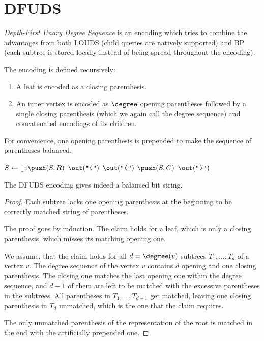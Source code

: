 \section{DFUDS}

\emph{Depth-First Unary Degree Sequence} is an encoding which tries to combine the advantages from both LOUDS (child queries are natively supported) and BP (each subtree is stored locally instead of being spread throughout the encoding).

The encoding is defined recursively:
\begin{enumerate}
	\item A leaf is encoded as a closing parenthesis.
	\item An inner vertex is encoded as $\degree$ opening parentheses followed by a single closing parenthesis (which we again call the degree sequence) and concatenated encodings of its children.
\end{enumerate}
For convenience, one opening parenthesis is prepended to make the sequence of parentheses balanced.

\begin{algorithm}
\begin{algorithmic}
	\State $S \gets []; \push(S, R)$ 
	\State $\out(\openingParen)$
			\State $\out(\openingParen)$
			\State $\push(S, C)$
		\EndFor
		\State $\out(\closingParen)$
	\EndWhile
\EndFunction
\end{algorithmic}
\end{algorithm}

\begin{lemma}\label{l:dfuds}
	The DFUDS encoding gives indeed a balanced bit string.
\end{lemma}
\begin{proof}
	Each subtree lacks one opening parenthesis at the beginning to be correctly matched string of parentheses.
	
	The proof goes by induction.
	The claim holds for a leaf, which is only a closing parenthesis, which misses its matching opening one.
	
	We assume, that the claim holds for all $d = \degree(v)$ subtrees $T_1, \ldots, T_d$ of a vertex $v$.
	The degree sequence of the vertex $v$ contains $d$ opening and one closing parenthesis.
	The closing one matches the last opening one within the degree sequence, and $d - 1$ of them are left to be matched with the excessive parentheses in the subtrees.
	All parentheses in $T_1, \ldots, T_{d-1}$ get matched, leaving one closing parenthesis in $T_d$ unmatched, which is the one that the claim requires.
	
	The only unmatched parenthesis of the representation of the root is matched in the end with the artificially prepended one.
\end{proof}

